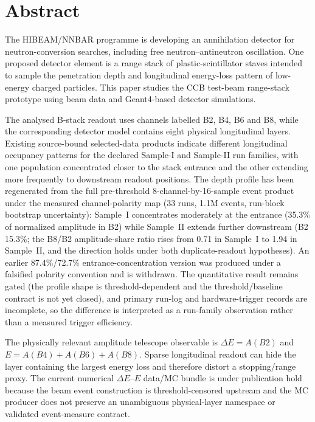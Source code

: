 \section*{Abstract}

The HIBEAM/NNBAR programme is developing an annihilation detector for neutron-conversion searches, including free neutron--antineutron oscillation. One proposed detector element is a range stack of plastic-scintillator staves intended to sample the penetration depth and longitudinal energy-loss pattern of low-energy charged particles. This paper studies the CCB test-beam range-stack prototype using beam data and Geant4-based detector simulations.

The analysed B-stack readout uses channels labelled B2, B4, B6 and B8, while the corresponding detector model contains eight physical longitudinal layers. Existing source-bound selected-data products indicate different longitudinal occupancy patterns for the declared Sample-I and Sample-II run families, with one population concentrated closer to the stack entrance and the other extending more frequently to downstream readout positions. The depth profile has been regenerated from the full pre-threshold 8-channel-by-16-sample event product under the measured channel-polarity map (33 runs, 1.1M events, run-block bootstrap uncertainty): Sample~I concentrates moderately at the entrance (35.3\% of normalized amplitude in B2) while Sample~II extends further downstream (B2 15.3\%; the B8/B2 amplitude-share ratio rises from 0.71 in Sample~I to 1.94 in Sample~II, and the direction holds under both duplicate-readout hypotheses). An earlier 87.4\%/72.7\% entrance-concentration version was produced under a falsified polarity convention and is withdrawn. The quantitative result remains gated (the profile shape is threshold-dependent and the threshold/baseline contract is not yet closed), and primary run-log and hardware-trigger records are incomplete, so the difference is interpreted as a run-family observation rather than a measured trigger efficiency.

The physically relevant amplitude telescope observable is \(\Delta E=A(B2)\) and \(E=A(B4)+A(B6)+A(B8)\). Sparse longitudinal readout can hide the layer containing the largest energy loss and therefore distort a stopping/range proxy. The current numerical \(\Delta E\)--\(E\) data/MC bundle is under publication hold because the beam event construction is threshold-censored upstream and the MC producer does not preserve an unambiguous physical-layer namespace or validated event-measure contract.


